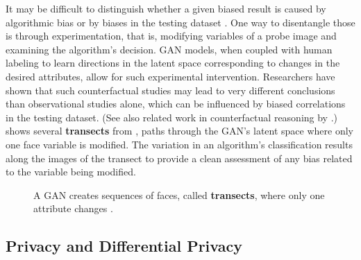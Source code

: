 It may be difficult to distinguish whether a given biased result is caused by algorithmic bias or by biases in the testing dataset \cite{Balakrishnan2020}.  One way to disentangle those is through experimentation, that is, modifying variables of a probe image and examining the algorithm's decision.  GAN models, when coupled with human labeling to learn directions in the latent space corresponding to changes in the desired attributes, allow for such experimental intervention. Researchers \cite{Balakrishnan2020} have shown that such counterfactual studies may lead to very different conclusions than observational studies alone, which can be influenced by biased correlations in the testing dataset.  (See also related work in counterfactual reasoning by \cite{Denton2019}.)  \Fig{\ref{fig:transect}} shows several {\bf transects} from \cite{Balakrishnan2020}, paths through the GAN's latent space where only one face variable is modified. The variation in an algorithm's classification results along the images of the transect to provide a clean assessment of any bias related to the variable being modified.

\begin{figure}[h!]
\centerline{
}
\caption{
A GAN creates sequences of faces, called {\bf transects}, where only one attribute changes \cite{Balakrishnan2020}. 
}
\label{fig:transect}
\end{figure}



\subsection{Privacy and Differential Privacy}

